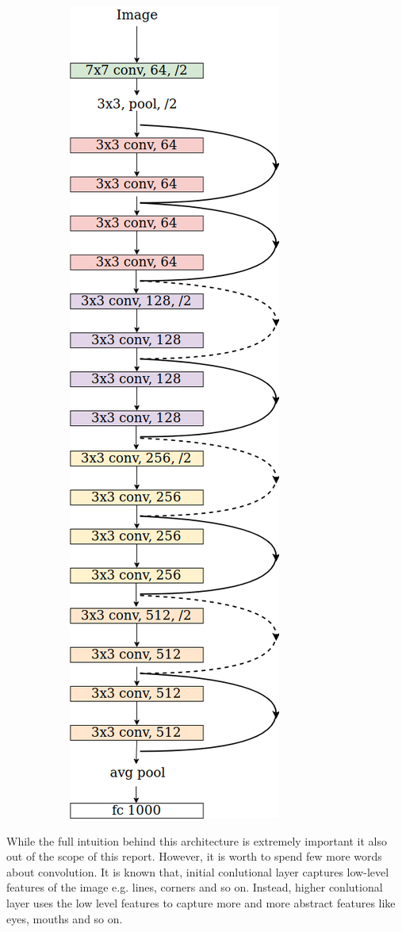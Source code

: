\begin{figure}
\begin{subfigure}{.5\textwidth}
        \includegraphics[width=.35\linewidth]{figs/resnet.png}
        \label{fig:resnet}
    \end{subfigure}
\end{figure}


While the full intuition behind this architecture is extremely important it also out of the scope of this report. However, it is worth to spend few more words about convolution. It is known that, initial conlutional layer captures low-level features of the image e.g. lines, corners and so on. Instead, higher conlutional layer uses the low level features to capture more and more abstract features like eyes, mouths and so on.


